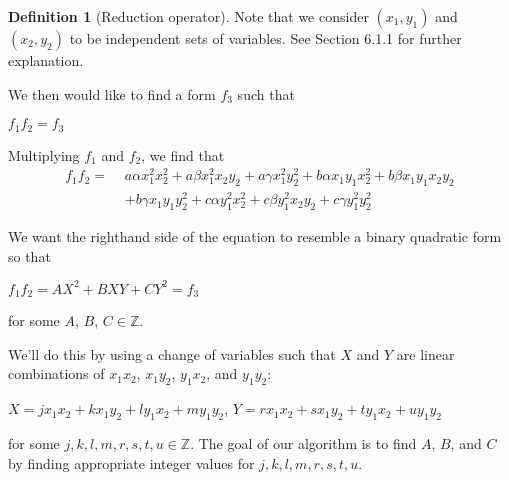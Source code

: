 \documentclass{article}
\theoremstyle{definition}
\newtheorem{definition}{Definition}[section]
\theoremstyle{theorem}
\theoremstyle{example}
\theoremstyle{corollary}
\begin{document}
\begin{definition}[Reduction operator]
\bigskip

Note that we consider \((x_{1}, y_{1})\) and \((x_{2}, y_{2})\) to be independent sets of variables. See Section 6.1.1 for further explanation.

\bigskip

We then would like to find a form \(f_{3}\) such that
\begin{center}
\(f_{1} f_{2} = f_{3}\)
\end{center}

\bigskip

Multiplying \(f_{1}\) and \(f_{2}\), we find that
\begin{align*}
f_{1} f_{2} = \, \, & a \alpha x_{1}^{2} x_{2}^{2} + a \beta x_{1}^{2} x_{2} y_{2} + a \gamma x_{1}^{2} y_{2}^{2} + b \alpha x_{1} y_{1} x_{2}^{2} + b \beta x_{1} y_{1} x_{2} y_{2} \\
&+ b \gamma x_{1} y_{1} y_{2}^{2} + c \alpha y_{1}^{2} x_{2}^{2} + c \beta y_{1}^{2} x_{2} y_{2} + c \gamma y_{1}^{2} y_{2}^{2}
\end{align*}

\bigskip

We want the righthand side of the equation to resemble a binary quadratic form so that
\begin{center}
\(f_{1} f_{2} = A X^{2} + B X Y + C Y^{2} = f_{3}\)
\end{center}
for some \(A\), \(B\), \(C \in \mathbb{Z}\).

\bigskip

We'll do this by using a change of variables such that \(X\) and \(Y\) are linear combinations of \(x_{1} x_{2}\), \(x_{1} y_{2}\), \(y_{1} x_{2}\), and \(y_{1} y_{2}\):
\begin{center}
\(X = j x_{1} x_{2} + k x_{1} y_{2} + l y_{1} x_{2} + m y_{1} y_{2}\), \quad \(Y = r x_{1} x_{2} + s x_{1} y_{2} + t y_{1} x_{2} + u y_{1} y_{2}\)
\end{center}
for some \(j, k, l, m, r, s, t, u \in \mathbb{Z}\). The goal of our algorithm is to find \(A\), \(B\), and \(C\) by finding appropriate integer values for \(j, k, l, m, r, s, t, u\).

\bigskip


\end{definition}
\end{document}
